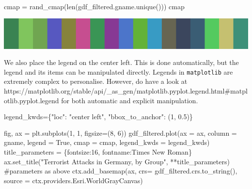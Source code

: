 \documentclass[
  letterpaper,
  DIV=11,
  numbers=noendperiod]{scrreprt}
\newenvironment{Shaded}{\begin{snugshade}}{\end{snugshade}}
\newcommand{\BuiltInTok}[1]{\textcolor[rgb]{0.00,0.23,0.31}{#1}}
\newcommand{\CommentTok}[1]{\textcolor[rgb]{0.37,0.37,0.37}{#1}}
\newcommand{\DecValTok}[1]{\textcolor[rgb]{0.68,0.00,0.00}{#1}}
\newcommand{\FloatTok}[1]{\textcolor[rgb]{0.68,0.00,0.00}{#1}}
\newcommand{\NormalTok}[1]{\textcolor[rgb]{0.00,0.23,0.31}{#1}}
\newcommand{\OperatorTok}[1]{\textcolor[rgb]{0.37,0.37,0.37}{#1}}
\newcommand{\StringTok}[1]{\textcolor[rgb]{0.13,0.47,0.30}{#1}}
\newcommand{\VariableTok}[1]{\textcolor[rgb]{0.07,0.07,0.07}{#1}}
\begin{document}
\begin{Shaded}
\begin{Highlighting}[]
\NormalTok{cmap }\OperatorTok{=}\NormalTok{ rand\_cmap(}\BuiltInTok{len}\NormalTok{(gdf\_filtered.gname.unique()))}
\NormalTok{cmap}
\end{Highlighting}
\end{Shaded}

\includegraphics{labs/w02_maps_files/figure-pdf/cell-45-output-1.png}

We also place the legend on the center left. This is done automatically,
but the legend and its items can be manipulated directly. Legends in
\texttt{matplotlib} are extremely complex to personalise. However, do
have a look at
https://matplotlib.org/stable/api/\_as\_gen/matplotlib.pyplot.legend.html\#matplotlib.pyplot.legend
for both automatic and explicit manipulation.

\begin{Shaded}
\begin{Highlighting}[]
\NormalTok{legend\_kwds}\OperatorTok{=}\NormalTok{\{}\StringTok{"loc"}\NormalTok{: }\StringTok{"center left"}\NormalTok{, }\StringTok{"bbox\_to\_anchor"}\NormalTok{: (}\DecValTok{1}\NormalTok{, }\FloatTok{0.5}\NormalTok{)\}}
\end{Highlighting}
\end{Shaded}

\begin{Shaded}
\begin{Highlighting}[]
\NormalTok{fig, ax }\OperatorTok{=}\NormalTok{ plt.subplots(}\DecValTok{1}\NormalTok{, }\DecValTok{1}\NormalTok{, figsize}\OperatorTok{=}\NormalTok{(}\DecValTok{8}\NormalTok{, }\DecValTok{6}\NormalTok{))}
\NormalTok{gdf\_filtered.plot(ax }\OperatorTok{=}\NormalTok{ ax, column }\OperatorTok{=} \StringTok{\textquotesingle{}gname\textquotesingle{}}\NormalTok{, legend }\OperatorTok{=} \VariableTok{True}\NormalTok{, cmap }\OperatorTok{=}\NormalTok{ cmap, legend\_kwds }\OperatorTok{=}\NormalTok{ legend\_kwds)}
\NormalTok{title\_parameters }\OperatorTok{=}\NormalTok{ \{}\StringTok{\textquotesingle{}fontsize\textquotesingle{}}\NormalTok{:}\StringTok{\textquotesingle{}16\textquotesingle{}}\NormalTok{, }\StringTok{\textquotesingle{}fontname\textquotesingle{}}\NormalTok{:}\StringTok{\textquotesingle{}Times New Roman\textquotesingle{}}\NormalTok{\}}
\NormalTok{ax.set\_title(}\StringTok{"Terrorist Attacks in Germany, by Group"}\NormalTok{, }\OperatorTok{**}\NormalTok{title\_parameters) }\CommentTok{\#parameters as above}
\NormalTok{ctx.add\_basemap(ax, crs}\OperatorTok{=}\NormalTok{ gdf\_filtered.crs.to\_string(), source }\OperatorTok{=}\NormalTok{ ctx.providers.Esri.WorldGrayCanvas)}
\end{Highlighting}
\end{Shaded}
\end{document}

